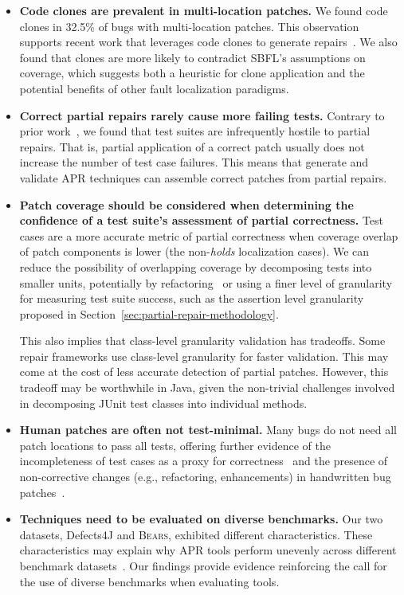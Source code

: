 \documentclass[10pt, conference]{IEEEtran}
\newcommand\bears{\textsc{Bears}\xspace}
\begin{document}
\begin{itemize}[wide, labelindent=0pt]
\item\textbf{Code clones are prevalent in multi-location patches.}
We found code clones in 32.5\% of bugs with multi-location
patches. This observation supports recent work that leverages code clones to
generate repairs~\cite{saha2019harnessing}.
We also found that clones are more likely to contradict SBFL's assumptions 
on coverage, which suggests both a heuristic for clone application and the
potential benefits of other fault localization paradigms.

\item\textbf{Correct partial repairs rarely cause more failing tests.}
Contrary to prior work~\cite{gecco09}, we found that test suites are infrequently
hostile to partial repairs. That is, partial application of a correct patch
usually does not increase the number of test case failures. This means that
generate and validate APR techniques can assemble correct patches from partial repairs.

\item\textbf{Patch coverage should be considered when determining the
  confidence of a test suite's assessment of partial correctness.}
Test cases are a more accurate metric of partial correctness when coverage
overlap of patch components is lower (the non-\emph{holds} localization cases).
We can reduce the possibility of overlapping coverage by decomposing tests into
smaller units, potentially by
refactoring~\cite{b-refactoring} or using a finer level of granularity for
measuring test suite success, such as the assertion level granularity proposed
in Section~\ref{sec:partial-repair-methodology}.

This also implies that class-level granularity validation has tradeoffs. Some
repair frameworks use class-level granularity for faster validation. This may
come at the cost of less accurate detection of partial patches. However, this
tradeoff may be worthwhile in Java, given the non-trivial challenges involved in
decomposing JUnit test classes into individual methods.

\item\textbf{Human patches are often not test-minimal.}
Many bugs do not need all patch locations to pass all tests,
offering further evidence of the incompleteness of test cases as a
proxy for correctness~\cite{patch-correctness} and the
presence of non-corrective changes (e.g., refactoring, enhancements)
in handwritten bug patches~\cite{api-refactoring, tangledchanges}.

\item\textbf{Techniques need to be evaluated on diverse benchmarks.}
Our two datasets, Defects4J and \bears, exhibited different characteristics.
These characteristics may explain why APR tools perform unevenly across
different benchmark datasets~\cite{durieux-repair-them-all}. Our findings
provide evidence reinforcing the call for the use of diverse benchmarks when
evaluating tools.
\end{itemize}
\end{document}
